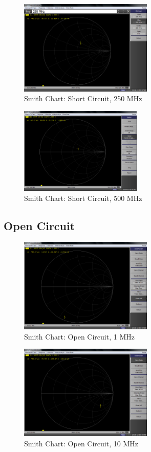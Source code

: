 \documentclass[conference]{IEEEtran}
\begin{document}
\begin{figure}[H]
  \centering
  \includegraphics[width=2.5in]{./img/smith_short_250_MHz.png}
  \caption{Smith Chart: Short Circuit, 250 MHz}
  \label{fig:smith_short_250_MHz}
\end{figure}

\begin{figure}[H]
  \centering
  \includegraphics[width=2.29in]{./img/smith_short_500_MHz.png}
  \caption{Smith Chart: Short Circuit, 500 MHz}
  \label{fig:smith_short_500_MHz}
\end{figure}

\subsection{Open Circuit}

\begin{figure}[H]
  \centering
  \includegraphics[width=2.5in]{./img/smith_open_1_MHz.png}
  \caption{Smith Chart: Open Circuit, 1 MHz}
  \label{fig:smith_open_1_MHz}
\end{figure}

\begin{figure}[H]
  \centering
  \includegraphics[width=2.5in]{./img/smith_open_10_MHz.png}
  \caption{Smith Chart: Open Circuit, 10 MHz}
  \label{fig:smith_open_10_MHz}
\end{figure}
\end{document}
